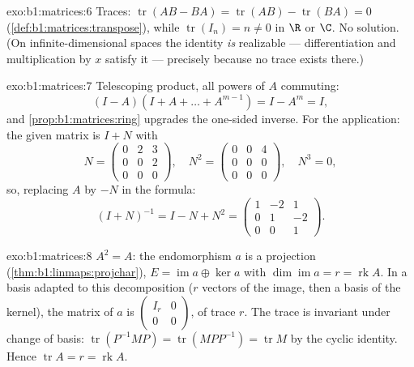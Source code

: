 \begin{solution}{exo:b1:matrices:6}
Traces: $\operatorname{tr}(AB - BA) = \operatorname{tr}(AB) -
\operatorname{tr}(BA) = 0$ (\cref{def:b1:matrices:transpose}),
while $\operatorname{tr}(I_n) = n \neq 0$ in $\R$ or $\C$. No
solution. (On infinite-dimensional spaces the identity \emph{is}
realizable --- differentiation and multiplication by $x$ satisfy it
--- precisely because no trace exists there.)
\end{solution}

\begin{solution}{exo:b1:matrices:7}
Telescoping product, all powers of $A$ commuting:
\[
(I - A)(I + A + \dots + A^{m-1}) = I - A^m = I ,
\]
and \cref{prop:b1:matrices:ring} upgrades the one-sided inverse. For
the application: the given matrix is $I + N$ with
\[
N = \begin{pmatrix} 0 & 2 & 3\\ 0 & 0 & 2\\ 0&0&0 \end{pmatrix},
\quad
N^2 = \begin{pmatrix} 0&0&4\\ 0&0&0\\ 0&0&0\end{pmatrix},
\quad N^3 = 0 ,
\]
so, replacing $A$ by $-N$ in the formula:
\[
(I + N)^{-1} = I - N + N^2 =
\begin{pmatrix}
1 & -2 & 1\\
0 & 1 & -2\\
0 & 0 & 1
\end{pmatrix}.
\]
\end{solution}

\begin{solution}{exo:b1:matrices:8}
$A^2 = A$: the endomorphism $a$ is a projection
(\cref{thm:b1:linmaps:projchar}), $E = \operatorname{im} a \oplus
\ker a$ with $\dim\operatorname{im} a = r = \operatorname{rk} A$. In
a basis adapted to this decomposition ($r$ vectors of the image,
then a basis of the kernel), the matrix of $a$ is
$\begin{pmatrix} I_r & 0\\ 0 & 0\end{pmatrix}$, of trace $r$. The
trace is invariant under change of basis:
$\operatorname{tr}(P^{-1}MP) = \operatorname{tr}(MPP^{-1}) =
\operatorname{tr} M$ by the cyclic identity. Hence
$\operatorname{tr} A = r = \operatorname{rk} A$.
\end{solution}

